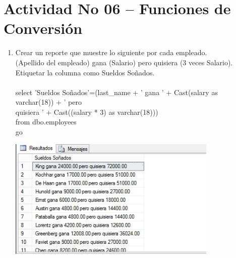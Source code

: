 \section{Actividad No 06 – Funciones de Conversi\'on} 
		
\begin{enumerate}[1.]
	\item Crear un reporte que muestre lo siguiente por cada empleado.
	\\(Apellido del empleado) gana (Salario) pero quisiera (3 veces Salario).
	\\Etiquetar la columna como Sueldos Soñados.
	\\
	\\select 'Sueldos Soñados'=(last\_name + ' gana ' + Cast(salary as varchar(18)) + ' pero 
	\\quisiera ' + Cast((salary * 3) as varchar(18))) 
	\\from dbo.employees
	\\go
	\\
	\begin{center}
	\includegraphics[width=10cm]{./Imagenes/img01} 
	\end{center}


\end{enumerate}
